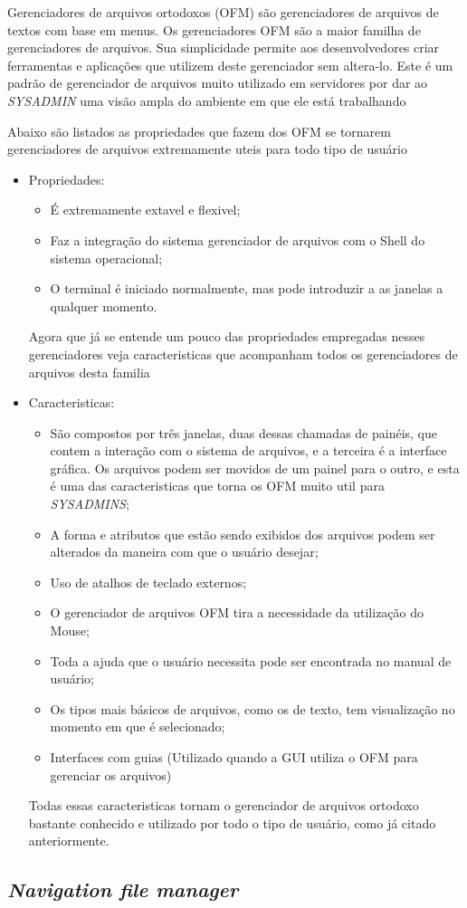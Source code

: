 \documentclass[12pt,a4paper,openany,oneside]{abntex2}
\begin{document}
Gerenciadores de arquivos ortodoxos (OFM) são gerenciadores de arquivos de textos com base em menus. Os gerenciadores OFM são a maior familha de gerenciadores de arquivos. Sua simplicidade permite aos desenvolvedores criar ferramentas e aplicações que utilizem deste gerenciador sem altera-lo. 
Este é um padrão de gerenciador de arquivos muito utilizado em servidores por dar ao \textit{SYSADMIN} uma visão ampla do ambiente em que ele está trabalhando

Abaixo são listados as propriedades que fazem dos OFM se tornarem gerenciadores de arquivos extremamente uteis para todo tipo de usuário

\begin{itemize}
	\item Propriedades: \\
	\begin{itemize}
		\item É extremamente extavel e flexivel;
		\item Faz a integração do sistema gerenciador de arquivos com o Shell do sistema operacional;
		\item O terminal é iniciado normalmente, mas pode introduzir a as janelas a qualquer momento.
	\end{itemize}

Agora que já se entende um pouco das propriedades empregadas nesses gerenciadores veja caracteristicas que acompanham todos os gerenciadores de arquivos desta familia

	\item Caracteristicas: \\ 
	\begin{itemize}
		\item São compostos por três janelas, duas dessas chamadas de painéis, que contem a interação com o sistema de arquivos, e a terceira é a interface gráfica. Os arquivos podem ser movidos de um painel para o outro, e esta é uma das caracteristicas que torna os OFM muito util para \textit{SYSADMINS};
		\item A forma e atributos que estão sendo exibidos dos arquivos podem ser alterados da maneira com que o usuário desejar;
		\item Uso de atalhos de teclado externos;
		\item O gerenciador de arquivos OFM tira a necessidade da utilização do Mouse;
		\item Toda a ajuda que o usuário necessita pode ser encontrada no manual de usuário;
		\item Os tipos mais básicos de arquivos, como os de texto, tem visualização no momento em que é selecionado;
		\item Interfaces com guias (Utilizado quando a GUI utiliza o OFM para gerenciar os arquivos)
	\end{itemize}

Todas essas caracteristicas tornam o gerenciador de arquivos ortodoxo bastante conhecido e utilizado por todo o tipo de usuário, como já citado anteriormente.
\end{itemize}



\subsection{\textit{Navigation file manager}}
\end{document}
